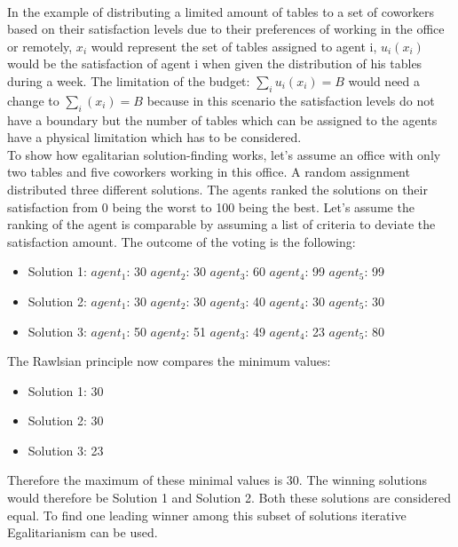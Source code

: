 \documentclass[german, a4paper, 11pt, oneside]{scrbook}
\begin{document}
\\In the example of distributing a limited amount of tables to a set of coworkers based on their satisfaction levels due to their preferences of working in the office or remotely, $x_i$ would represent the set of tables assigned to agent i, $u_i(x_i)$ would be the satisfaction of agent i when given the distribution of his tables during a week. The limitation of the budget: $\sum_{i}u_i(x_i) = B$ would need a change to $\sum_{i}(x_i) = B$ because in this scenario the satisfaction levels do not have a boundary but the number of tables which can be assigned to the agents have a physical limitation which has to be considered.
\\To show how egalitarian solution-finding works, let's assume an office with only two tables and five coworkers working in this office. A random assignment distributed three different solutions. The agents ranked the solutions on their satisfaction from 0 being the worst to 100 being the best. Let's assume the ranking of the agent is comparable by assuming a list of criteria to deviate the satisfaction amount. The outcome of the voting is the following:
\begin{itemize}
\item Solution 1: $agent_1$: 30 $agent_2$: 30  $agent_3$: 60 $agent_4$: 99 $agent_5$: 99
\item Solution 2: $agent_1$: 30 $agent_2$: 30  $agent_3$: 40 $agent_4$: 30 $agent_5$: 30
\item Solution 3: $agent_1$: 50 $agent_2$: 51  $agent_3$: 49 $agent_4$: 23 $agent_5$: 80
\end{itemize}
The Rawlsian principle now compares the minimum values:
\begin{itemize}
\item Solution 1: 30 
\item Solution 2: 30 
\item Solution 3: 23
\end{itemize}
Therefore the maximum of these minimal values is 30. The winning solutions would therefore be Solution 1 and Solution 2. Both these solutions are considered equal. To find one leading winner among this subset of solutions iterative Egalitarianism can be used.
\end{document}

